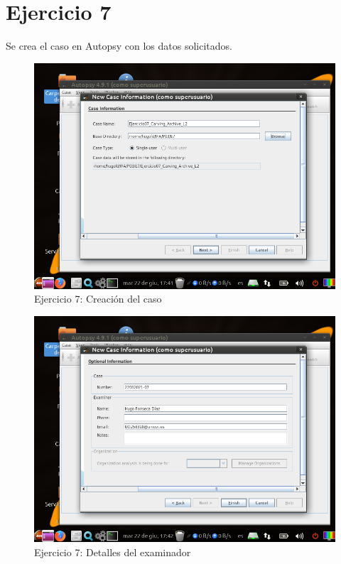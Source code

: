 \documentclass[11pt]{article}
\begin{document}
\section{Ejercicio 7}
Se crea el caso en Autopsy con los datos solicitados.

\begin{figure}[H]
    \caption{Ejercicio 7: Creación del caso}
    \centering
    \includegraphics[scale=0.7]{e7-1.png}
\end{figure}

\begin{figure}[H]
    \caption{Ejercicio 7: Detalles del examinador}
    \centering
    \includegraphics[scale=0.7]{e7-2.png}
\end{figure}
\end{document}
